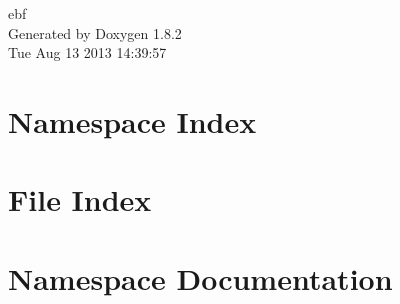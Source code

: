 \documentclass{book}
\begin{document}
\hypersetup{pageanchor=false,citecolor=blue}
\begin{titlepage}
\vspace*{7cm}
\begin{center}
{\Large ebf }\\
\vspace*{1cm}
{\large Generated by Doxygen 1.8.2}\\
\vspace*{0.5cm}
{\small Tue Aug 13 2013 14:39:57}\\
\end{center}
\end{titlepage}
\clearemptydoublepage
{}
\tableofcontents
\clearemptydoublepage
{}
\hypersetup{pageanchor=true,citecolor=blue}
\chapter{Namespace Index}

\chapter{File Index}

\chapter{Namespace Documentation}























































\end{document}
